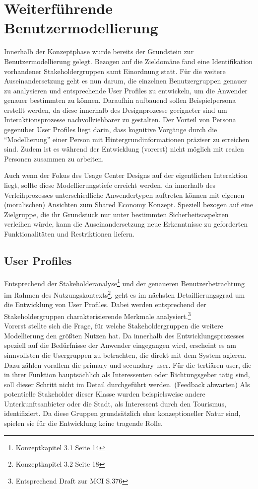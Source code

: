 
\section{Weiterführende Benutzermodellierung}
Innerhalb der Konzeptphase wurde bereits der Grundstein zur Benutzermodellierung gelegt. Bezogen auf die Zieldomäne fand eine Identifikation vorhandener Stakeholdergruppen samt Einordnung statt. Für die weitere Auseinandersetzung geht es nun darum, die einzelnen Benutzergruppen genauer zu analysieren und entsprechende User Profiles zu entwickeln, um die Anwender genauer bestimmten zu können. Daraufhin aufbauend sollen Beispielpersona erstellt werden, da diese innerhalb des Designprozesse geeigneter sind um Interaktionsprozesse nachvollziehbarer zu gestalten. Der Vorteil von Persona gegenüber User Profiles liegt darin, dass kognitive Vorgänge durch die “Modellierung” einer Person mit Hintergrundinformationen präziser zu erreichen sind. Zudem ist es während der Entwicklung (vorerst) nicht möglich mit realen Personen zusammen zu arbeiten. 

Auch wenn der Fokus des Usage Center Designs auf der eigentlichen Interaktion liegt, sollte diese Modellierungstiefe erreicht werden, da innerhalb des Verleihprozesses unterschiedliche Anwendertypen auftreten können mit eigenen (moralischen) Ansichten zum Shared Economy Konzept. Speziell bezogen auf eine Zielgruppe, die ihr Grundstück nur unter bestimmten Sicherheitsaspekten verleihen würde, kann die Auseinandersetzung neue Erkenntnisse zu geforderten Funktionalitäten und Restriktionen liefern.

\subsection{User Profiles}
Entsprechend der Stakeholderanalyse\footnote{Konzeptkapitel 3.1 Seite 14} und der genaueren Benutzerbetrachtung im Rahmen des Nutzungskontexts\footnote{Konzeptkapitel 3.2 Seite 18}, geht es im nächsten Detaillierungsgrad um die Entwicklung von User Profiles. Dabei werden entsprechend der Stakeholdergruppen charakterisierende Merkmale analysiert.\footnote{Entsprechend Draft zur MCI S.376}\\
Vorerst stellte sich die Frage, für welche Stakeholdergruppen die weitere Modellierung den größten Nutzen hat. Da innerhalb des Entwicklungsprozesses speziell auf die Bedürfnisse der Anwender eingegangen wird, erscheint es am sinnvollsten die Usergruppen zu betrachten, die direkt mit dem System agieren. Dazu zählen vorallem die primary und secundary user. Für die tertiären user, die in ihrer Funktion hauptsächlich als Interessenten oder Richtungsgeber tätig sind, soll dieser Schritt nicht im Detail durchgeführt werden. (Feedback abwarten) Als potentielle Stakeholder dieser Klasse wurden beispielsweise andere Unterkunftsanbieter oder die Stadt, als Interessent durch den Tourismus, identifiziert. Da diese Gruppen grundsätzlich eher konzeptioneller Natur sind, spielen sie für die Entwicklung keine tragende Rolle.\\

